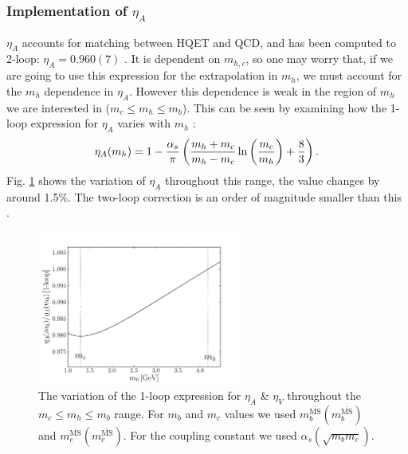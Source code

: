 \subsubsection{Implementation of $\eta_A$}

$\eta_A$ accounts for matching between HQET and QCD, and has been computed to 2-loop: $\eta_A = 0.960(7)$ \cite{PhysRevLett.76.4124}. It is dependent on $m_{h,c}$, so one may worry that, if we are going to use this expression for the extrapolation in $m_h$, we must account for the $m_h$ dependence in $\eta_A$. However this dependence is weak in the region of $m_h$ we are interested in ($m_c \leq m_h \leq m_b$). This can be seen by examining how the 1-loop expression for $\eta_A$ varies with $m_h$ \cite{CLOSE1984209}:
\begin{align}
  \eta_A(m_h) = 1 - {\alpha_s \over \pi} \left( {m_h+m_c\over m_h-m_c} \ln\left({m_c\over m_h}\right) + {8\over 3} \right).
  \label{eq:etaA}
\end{align}
Fig. \ref{fig:etaAV} shows the variation of $\eta_A$ throughout this range, the value changes by around 1.5\%. The two-loop correction is an order of magnitude smaller than this \cite{PhysRevLett.76.4124}.

\begin{figure}[htb!]
  \begin{center}
  \includegraphics[width=0.6\textwidth]{images/BsDsstar/etaAV.pdf}
  \caption{The variation of the 1-loop expression for $\eta_{A}$ \& $\eta_V$ throughout the $m_c \leq m_h \leq m_b$ range. For $m_b$ and $m_c$ values we used $m^{\overline{\text{MS}}}_b(m^{\overline{\text{MS}}}_b)$ and $m^{\overline{\text{MS}}}_c(m^{\overline{\text{MS}}}_c)$. For the coupling constant we used $\alpha_s(\sqrt{m_b m_c})$. \label{fig:etaAV}}
  \end{center}
  \vspace{-10pt}
\end{figure}

